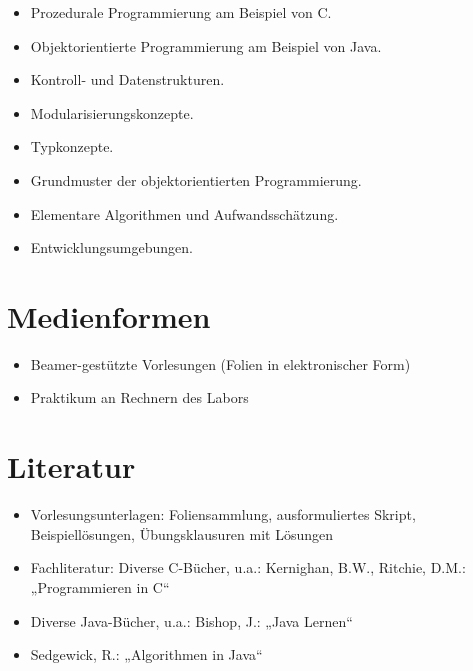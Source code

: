 \begin{itemize}
\tightlist
\item
  Prozedurale Programmierung am Beispiel von C.
\item
  Objektorientierte Programmierung am Beispiel von Java.
\item
  Kontroll- und Datenstrukturen.
\item
  Modularisierungskonzepte.
\item
  Typkonzepte.
\item
  Grundmuster der objektorientierten Programmierung.
\item
  Elementare Algorithmen und Aufwandsschätzung.
\item
  Entwicklungsumgebungen.
\end{itemize}

\hypertarget{medienformenpathlabel....srcmodulbeschreibungen-bachelor-bpo5ba_algorithmenundprogrammierung1}{%
\section*{Medienformen\label{../../src/modulbeschreibungen-bachelor-bpo5/BA_AlgorithmenundProgrammierung1}}\label{medienformenpathlabel....srcmodulbeschreibungen-bachelor-bpo5ba_algorithmenundprogrammierung1}}

\begin{itemize}
\tightlist
\item
  Beamer-gestützte Vorlesungen (Folien in elektronischer Form)
\item
  Praktikum an Rechnern des Labors
\end{itemize}

\hypertarget{literaturpathlabel....srcmodulbeschreibungen-bachelor-bpo5ba_algorithmenundprogrammierung1}{%
\section*{Literatur\label{../../src/modulbeschreibungen-bachelor-bpo5/BA_AlgorithmenundProgrammierung1}}\label{literaturpathlabel....srcmodulbeschreibungen-bachelor-bpo5ba_algorithmenundprogrammierung1}}

\begin{itemize}
\tightlist
\item
  Vorlesungsunterlagen: Foliensammlung, ausformuliertes Skript,
  Beispiellösungen, Übungsklausuren mit Lösungen
\item
  Fachliteratur: Diverse C-Bücher, u.a.: Kernighan, B.W., Ritchie, D.M.:
  „Programmieren in C``
\item
  Diverse Java-Bücher, u.a.: Bishop, J.: „Java Lernen``
\item
  Sedgewick, R.: „Algorithmen in Java``
\end{itemize}

